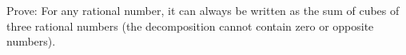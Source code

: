 \documentclass[preview]{standalone}
\begin{document}
\begin{center}
Prove: For any rational number, it can always be written as the sum of cubes of three rational numbers (the decomposition cannot contain zero or opposite numbers).
\end{center}
\end{document}
